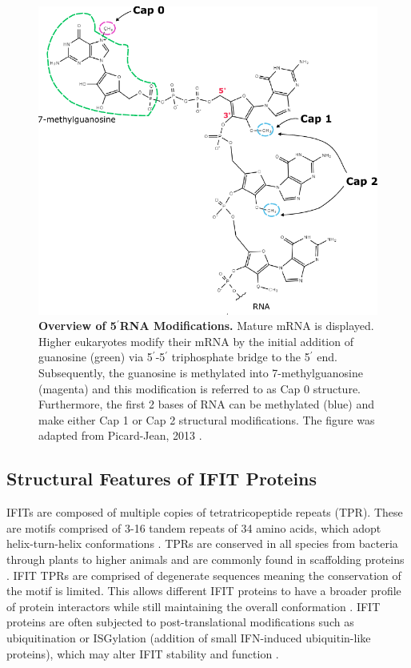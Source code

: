 \begin{figure}
    \centering
    \includegraphics[width=0.75\linewidth]{04. Introduction//Figs/02. 5-RNA Modifications.pdf}
    \caption[Overview of 5$^{\prime}$RNA Modifications.]{\textbf{Overview of 5$^{\prime}$RNA Modifications.} Mature mRNA is displayed. Higher eukaryotes modify their mRNA by the initial addition of guanosine (green) via 5$^{\prime}$-5$^{\prime}$ triphosphate bridge to the 5$^{\prime}$ end. Subsequently, the guanosine is methylated into 7-methylguanosine (magenta) and this modification is referred to as Cap 0 structure. Furthermore, the first 2 bases of RNA can be methylated (blue) and make either Cap 1 or Cap 2 structural modifications. The figure was adapted from Picard-Jean, 2013 \cite{Picard-Jean2013RNAGenomes}.}
    \label{fig:Overview of 5'RNA Modifications.}
\end{figure}

\subsection{Structural Features of IFIT Proteins} \label{subsec:Structural Features of IFIT Proteins}
IFITs are composed of multiple copies of tetratricopeptide repeats (TPR). These are motifs comprised of 3-16 tandem repeats of 34 amino acids, which adopt helix-turn-helix conformations \cite{DAndrea2003TPRHelix}. TPRs are conserved in all species from bacteria through plants to higher animals and are commonly found in scaffolding proteins \cite{Vladimer2014IFITs:Proteins}. IFIT TPRs are comprised of degenerate sequences meaning the conservation of the motif is limited. This allows different IFIT proteins to have a broader profile of protein interactors while still maintaining the overall conformation \cite{Fensterl2015Interferon-InducedPathogenesis}. IFIT proteins are often subjected to post-translational modifications such as ubiquitination or ISGylation (addition of small IFN-induced ubiquitin-like proteins), which may alter IFIT stability and function \cite{Thery2021ProteomicsImmunity, Zhao2005HumanPathways, Radoshevich2015ISG15Infection, Zhu2021ProteomicInterferon}.

